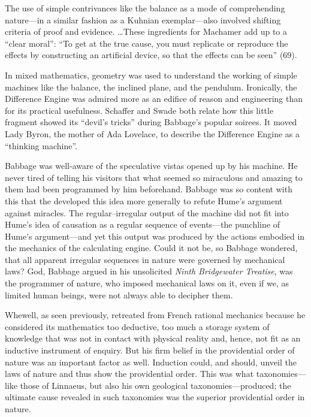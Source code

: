 \documentclass[version=last,draft=true,paper=A4,portrait,twoside=true,twocolumn=false,headinclude=false,footinclude=false,fontsize=12,BCOR=20mm,DIV=calc,pagesize=auto,titlepage=firstiscover,mpinclude=true,open=right,chapterprefix=true,numbers=autoendperiod,headsepline=false,headings=twolinechapter,parskip=false]{scrbook}
\begin{document}
The use of simple contrivances like the balance as a mode of comprehending
nature---in a similar fashion as a Kuhnian exemplar---also involved
shifting criteria of proof and evidence. \ldots These ingredients for
Machamer add up to a ``clear moral'': ``To get at the true cause, you must
replicate or reproduce the effects by constructing an artificial device, so
that the effects can be seen'' (69).

In mixed mathematics, geometry was used to understand the working of simple
machines like the balance, the inclined plane, and the pendulum. 
Ironically, the Difference Engine was admired more as an edifice of reason
and engineering than for its practical usefulness. Schaffer and Swade both
relate how this little fragment showed its ``devil's tricks'' during
Babbage's popular soirees. It moved Lady Byron, the mother of Ada Lovelace,
to describe the Difference Engine as a ``thinking machine''.

Babbage was well-aware of the speculative vistas opened up by his machine.
 He never tired of telling his visitors that what seemed so miraculous and
 amazing to them had been programmed by him beforehand. Babbage was so
 content with this that the developed this idea more generally to refute
 Hume's argument against miracles. The regular--irregular output of the
 machine did not fit into Hume's idea of causation as a regular sequence of
 events---the punchline of Hume's argument---and yet this output was
 produced by the actions embodied in the mechanics of the calculating
 engine. Could it not be, so Babbage wondered, that all apparent irregular
 sequences in nature were governed by mechanical laws? God, Babbage argued
 in his unsolicited \emph{Ninth Bridgewater Treatise}, was the programmer of
 nature, who imposed mechanical laws on it, even if we, as limited human
 beings, were not always able to decipher them.

Whewell, as seen previously, retreated from French rational mechanics
because he considered its mathematics too deductive, too much a storage
system of knowledge that was not in contact with physical reality and,
hence, not fit as an inductive instrument of enquiry. But his firm belief
in the providential order of nature was an important factor as well.
Induction could, and should, unveil the laws of nature and thus show the
providential order. This was what taxonomies---like those of Linnaeus, but
also his own geological taxonomies---produced; the ultimate cause revealed
in such taxonomies was the superior providential order in nature. 
\end{document}
